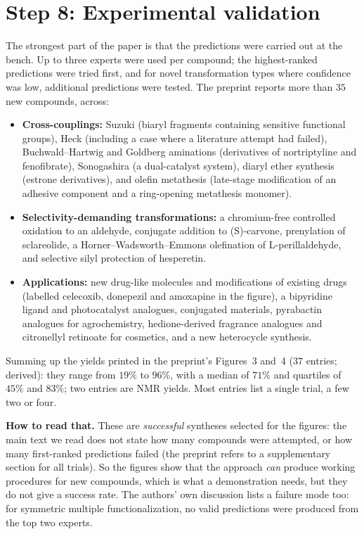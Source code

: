 \documentclass[11pt]{article}
\begin{document}
\section{Step 8: Experimental validation}
The strongest part of the paper is that the predictions were carried out at the bench. Up to three experts were used per compound; the highest-ranked predictions were tried first, and for novel transformation types where confidence was low, additional predictions were tested. The preprint reports more than $35$ new compounds, across:
\begin{itemize}[nosep]
  \item \textbf{Cross-couplings:} Suzuki (biaryl fragments containing sensitive functional groups), Heck (including a case where a literature attempt had failed), Buchwald--Hartwig and Goldberg aminations (derivatives of nortriptyline and fenofibrate), Sonogashira (a dual-catalyst system), diaryl ether synthesis (estrone derivatives), and olefin metathesis (late-stage modification of an adhesive component and a ring-opening metathesis monomer).
  \item \textbf{Selectivity-demanding transformations:} a chromium-free controlled oxidation to an aldehyde, conjugate addition to (S)-carvone, prenylation of sclareolide, a Horner--Wadsworth--Emmons olefination of L-perillaldehyde, and selective silyl protection of hesperetin.
  \item \textbf{Applications:} new drug-like molecules and modifications of existing drugs (labelled celecoxib, donepezil and amoxapine in the figure), a bipyridine ligand and photocatalyst analogues, conjugated materials, pyrabactin analogues for agrochemistry, hedione-derived fragrance analogues and citronellyl retinoate for cosmetics, and a new heterocycle synthesis.
\end{itemize}
Summing up the yields printed in the preprint's Figures~3 and~4 ($37$ entries; derived): they range from $19\%$ to $96\%$, with a median of $71\%$ and quartiles of $45\%$ and $83\%$; two entries are NMR yields. Most entries list a single trial, a few two or four.

\textbf{How to read that.} These are \emph{successful} syntheses selected for the figures: the main text we read does not state how many compounds were attempted, or how many first-ranked predictions failed (the preprint refers to a supplementary section for all trials). So the figures show that the approach \emph{can} produce working procedures for new compounds, which is what a demonstration needs, but they do not give a success rate. The authors' own discussion lists a failure mode too: for symmetric multiple functionalization, no valid predictions were produced from the top two experts.
\end{document}
